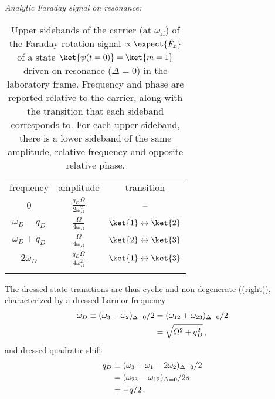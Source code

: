 \textit{Analytic Faraday signal on resonance:}
\begin{table}[t]
    \caption{Upper sidebands of the carrier (at $\omega_{\text{rf}}$) of the Faraday rotation signal $\propto \expect{\hat{F}_x}$ of a state $\ket{\psi(t=0)}=\ket{m=1}$ driven on resonance ($\Delta = 0$) in the laboratory frame. Frequency and phase are reported relative to the carrier, along with the transition that each sideband corresponds to. For each upper sideband, there is a lower sideband of the same amplitude, relative frequency and opposite \note{$\pi$} relative phase.}
    \label{tab:sidebands}
    \begin{tabular}{ccc}
    \hhline{===}
    frequency & amplitude & transition \\ \hhline{---}
     $0$ & $\frac{q_D \Omega }{2 \omega_D^2}$ & -- \\
     $\omega_D-q_D$ & $\frac{\Omega}{4 \omega_D}$ & $\ket{1} \leftrightarrow \ket{2}$ \\
     $\omega_D+q_D$ & $\frac{\Omega}{4 \omega_D}$ & $\ket{2} \leftrightarrow \ket{3}$\\
     $2 \omega_D$ & $\frac{q_D \Omega}{4 \omega_D^2}$ & $\ket{1} \leftrightarrow \ket{3}$ \\ \hhline{===}
    \end{tabular}
\end{table}


The dressed-state transitions are thus cyclic and non-degenerate ((right)), characterized by a dressed Larmor frequency
\begin{align}
\label{eq:dressed_larmor}
   \omega_D \equiv (\omega_3 - \omega_2)_{\Delta=0}/2 &= (\omega_{12} + \omega_{23})_{\Delta=0}/2 \notag\\ &= \sqrt{\Omega^2 + q_D^2}\, ,
\end{align}
and dressed quadratic shift
\begin{align}
\label{eq:dressed_quadratic}
   q_D &\equiv (\omega_3 + \omega_1 -2\omega_2)_{\Delta=0}/2 \notag\\
       &= (\omega_{23}-\omega_{12})_{\Delta=0}/2 \notag s\\ 
       &= -q/2 \, .
\end{align}